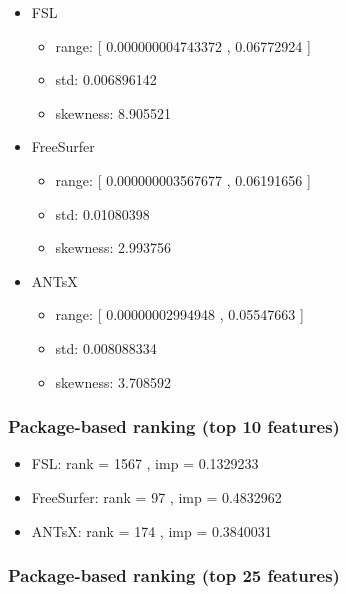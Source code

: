 \documentclass[
  10pt,
]{article}
\begin{document}
\begin{itemize}
\item
  FSL

  \begin{itemize}
  \item
    range: {[} 0.000000004743372 , 0.06772924 {]}
  \item
    std: 0.006896142
  \item
    skewness: 8.905521
  \end{itemize}
\item
  FreeSurfer

  \begin{itemize}
  \item
    range: {[} 0.000000003567677 , 0.06191656 {]}
  \item
    std: 0.01080398
  \item
    skewness: 2.993756
  \end{itemize}
\item
  ANTsX

  \begin{itemize}
  \item
    range: {[} 0.00000002994948 , 0.05547663 {]}
  \item
    std: 0.008088334
  \item
    skewness: 3.708592
  \end{itemize}
\end{itemize}

\hypertarget{package-based-ranking-top-10-features-2}{%
\subsubsection{Package-based ranking (top 10
features)}\label{package-based-ranking-top-10-features-2}}

\begin{itemize}
\item
  FSL: rank = 1567 , imp = 0.1329233
\item
  FreeSurfer: rank = 97 , imp = 0.4832962
\item
  ANTsX: rank = 174 , imp = 0.3840031
\end{itemize}

\hypertarget{package-based-ranking-top-25-features-2}{%
\subsubsection{Package-based ranking (top 25
features)}\label{package-based-ranking-top-25-features-2}}
\end{document}
